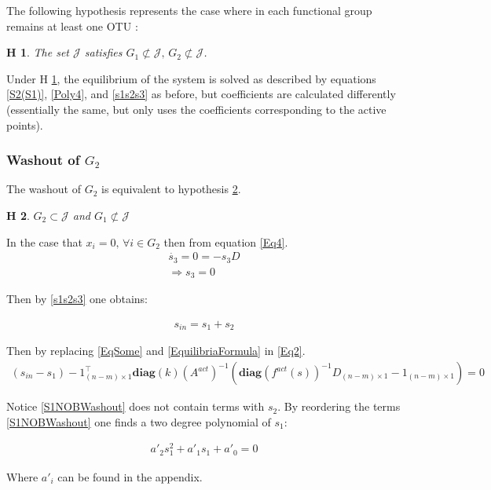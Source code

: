 \documentclass[3p,times]{elsarticle}
\newcommand{\diag}{\textbf{diag}}
\newtheorem{hypo}{H}
\begin{document}
The following hypothesis represents the case where in each functional group remains at least one OTU :
\begin{hypo}The set $\mathcal{J}$ satisfies $ G_1 \not \subset \mathcal{J} , \, G_2 \not \subset \mathcal{J} $.
	\label{noWashoutHyp}
\end{hypo} 

Under H \ref{noWashoutHyp}, the equilibrium of the system is solved as described by equations \eqref{S2(S1)}, \eqref{Poly4}, and \eqref{s1s2s3} as before, but coefficients are calculated differently (essentially the same, but only uses the coefficients corresponding to the active points).

\subsubsection{Washout of $G_2$}

The washout of $G_2$ is equivalent to  hypothesis \ref{WashoutG2}.

\begin{hypo}
	$G_2 \subset \mathcal{J}$ and $G_1 \not \subset \mathcal{J}$
	\label{WashoutG2}
\end{hypo} 

In the case that $x_i = 0, \, \forall i \in G_2$ then from equation \eqref{Eq4}.
\begin{align}
\dot{s_3} = 0 = -s_3D \\
\Rightarrow s_3 = 0
\end{align}

Then by \eqref{s1s2s3} one obtains:

\begin{align}
s_{in} = s_1 + s_2
\end{align}

Then by replacing  \eqref{EqSome} and \eqref{EquilibriaFormula} in \eqref{Eq2}.
\begin{align}
\label{S1NOBWashout}  (s_{in}-s_1)-1_{(n-m)\times 1}^\top
\diag(k)(A^{act})^{-1}(\diag(f^{act}(s))^{-1}D_{(n-m)\times 1} - 1_{(n-m)\times 1}) = 0 
\end{align}

Notice \eqref{S1NOBWashout} does not contain terms with $s_2$. By reordering the terms \eqref{S1NOBWashout} one finds a two degree polynomial of $s_1$:

\begin{align}
a'_2 s_1^2 + a'_1s_1 + a'_0 = 0
\end{align}

Where $a'_i$ can be found in the appendix.
\end{document}
